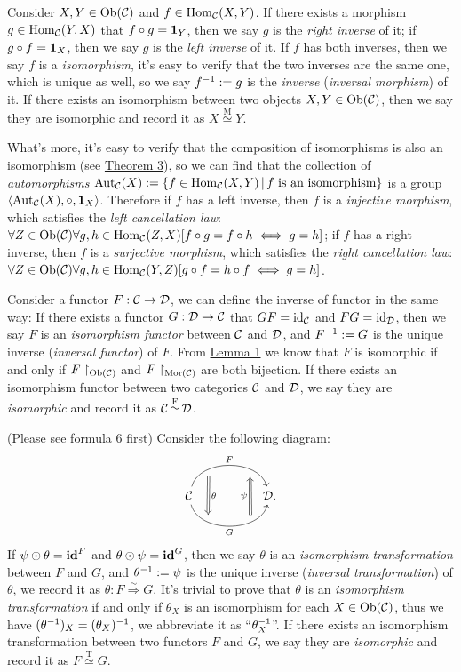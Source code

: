 \documentclass{article}
\begin{document}
\begin{defi}\label{inverse}
	Consider $X,Y\in\mathrm{Ob}(\mathcal{C})$ and $f\in\mathrm{Hom}_{\mathcal{C}}(X,Y)$. If there exists a morphism $g\in\mathrm{Hom}_{\mathcal{C}}(Y,X)$ that $f\circ g=\mathbf{1}_Y$, then we say $g$ is the \emph{right inverse} of it; if $g\circ f=\mathbf{1}_X$, then we say $g$ is the \emph{left inverse} of it. If $f$ has both inverses, then we say $f$ is a \emph{isomorphism}, it's easy to verify that the two inverses  are the same one, which is unique as well, so we say $f^{-1}:=g$ is the \emph{inverse} (\emph{inversal morphism}) of it. If there exists an isomorphism between two objects $X,Y\in\mathrm{Ob}(\mathcal{C})$, then we say they are isomorphic and record it as $X\mathop{\simeq}\limits^\mathrm{M}Y$.
	
	What's more, it's easy to verify that the composition of isomorphisms is also an isomorphism (see \hyperref[transitivity]{Theorem 3}), so we can find that the collection of \emph{automorphisms} $\mathrm{Aut}_\C(X):=\{f\in\Hom_\C(X,Y)\,|\,f\ \text{is an isomorphism}\}$ is a group $\left<\mathrm{Aut}_{\mathcal{C}}(X),\circ,\mathbf{1}_X\right>$. Therefore if $f$ has a left inverse, then $f$ is a \emph{injective morphism}, which satisfies the \emph{left cancellation law}: $\forall Z\in\mathrm{Ob}(\mathcal{C})\forall g,h\in\mathrm{Hom}_{\mathcal{C}}(Z,X)[f\circ g=f\circ h\iff g=h]$; if $f$ has a right inverse, then $f$ is a \emph{surjective morphism}, which satisfies the \emph{right cancellation law}: $\forall Z\in\mathrm{Ob}(\mathcal{C})\forall g,h\in\mathrm{Hom}_{\mathcal{C}}(Y,Z)[g\circ f=h\circ f\iff g=h]$.
	
	Consider a functor $F:\mathcal{C}\to\mathcal{D}$, we can define the inverse of functor in the same way: If there exists a functor $G:\mathcal{D}\to\mathcal{C}$ that $GF=\mathrm{id}_{\mathcal{C}}$ and $FG=\mathrm{id}_{\mathcal{D}}$, then we say $F$ is an \emph{isomorphism functor} between $\mathcal{C}$ and $\mathcal{D}$, and $F^{-1}:=G$ is the unique inverse (\emph{inversal functor}) of $F$. From \hyperref[map]{Lemma 1} we know that $F$ is isomorphic if and only if  $F\upharpoonright_{\mathrm{Ob}(\mathcal{C})}$ and $F\upharpoonright_{\mathrm{Mor}(\mathcal{C})}$ are both bijection. If there exists an isomorphism functor between two categories $\mathcal{C}$ and $\mathcal{D}$, we say they are \emph{isomorphic} and record it as $\mathcal{C}\mathop{\simeq}\limits^\mathrm{F}\mathcal{D}$.
	
	(Please see \hyperref[1]{formula 6} first) Consider the following diagram:
	\[\begin{tikzcd}
		\C 
		\arrow[rr, bend left =75, "F", ""' {name=U1, near start}, ""' {name=U2, near end}]
		\arrow[rr, bend right=75, "G"', "" {name=D1, near start}, ""  {name=D2, near end}]
		&&\D.
		\arrow[Rightarrow, "\theta", from=U1, to=D1]
		\arrow[Rightarrow, "\psi"  , from=D2, to=U2]
    \end{tikzcd}\]
	If $\psi\odot\theta=\mathbf{id}^F$ and $\theta\odot\psi=\mathbf{id}^G$, then we say $\theta$ is an \emph{isomorphism transformation} between $F$ and $G$, and $\theta^{-1}:=\psi$ is the unique inverse (\emph{inversal transformation}) of $\theta$, we record it as $\theta:F\mathop{\Rightarrow}\limits^{\sim}G$. It's trivial to prove that $\theta$ is an \emph{isomorphism transformation} if and only if $\theta_X$ is an isomorphism for each $X\in\mathrm{Ob}(\mathcal{C})$, thus we have $(\theta^{-1})_X=(\theta_X)^{-1}$, we abbreviate it as ``$\theta^{-1}_X$''. If there exists an isomorphism transformation between two functors $F$ and $G$, we say they are \emph{isomorphic} and record it as $F\mathop{\simeq}\limits^\mathrm{T}G$.
	

\end{defi}
\end{document}
